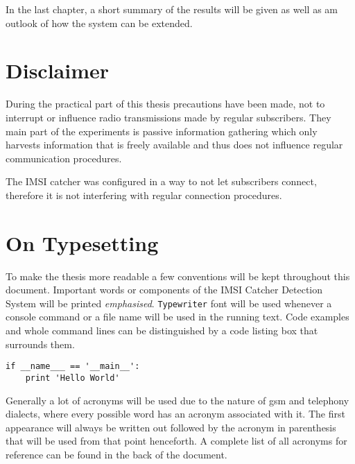 In the last chapter, a short summary of the results will be given as well as am outlook of how the system can be extended.

\section{Disclaimer}
During the practical part of this thesis precautions have been made, not to interrupt or influence radio transmissions made by regular subscribers.
They main part of the experiments is passive information gathering which only harvests information that is freely available and thus does not influence regular communication procedures.

The IMSI catcher was configured in a way to not let subscribers connect, therefore it is not interfering with regular connection procedures.

\section{On Typesetting}
To make the thesis more readable a few conventions will be kept throughout this document.
Important words or components of the IMSI Catcher Detection System will be printed \emph{emphasised}.
\texttt{Typewriter} font will be used whenever a console command or a file name will be used in the running text.
Code examples and whole command lines can be distinguished by a code listing box that surrounds them.
\begin{lstlisting}
if __name___ == '__main__':
    print 'Hello World'
\end{lstlisting} 

Generally a lot of acronyms will be used due to the nature of \gls{gsm} and telephony dialects, where every possible word has an acronym associated with it.
The first appearance will always be written out followed by the acronym in parenthesis that will be used from that point henceforth.
A complete list of all acronyms for reference can be found in the back of the document.